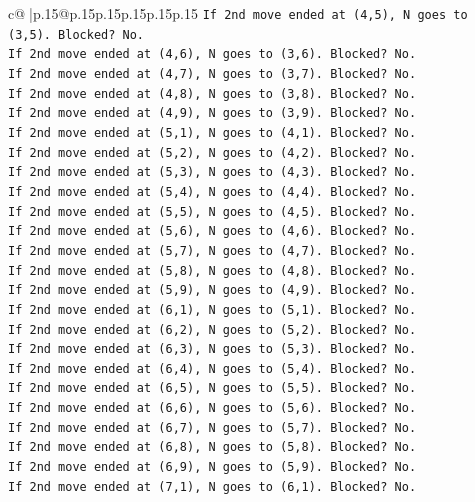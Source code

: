\documentclass{article}
\begin{document}
{\begin{supertabular}{c@{$\;$}|p{.15\linewidth}@{}p{.15\linewidth}p{.15\linewidth}p{.15\linewidth}p{.15\linewidth}p{.15\linewidth}}
{{{\texttt{If 2nd move ended at (4,5), N goes to (3,5). Blocked? No.} \\
\texttt{If 2nd move ended at (4,6), N goes to (3,6). Blocked? No.} \\
\texttt{If 2nd move ended at (4,7), N goes to (3,7). Blocked? No.} \\
\texttt{If 2nd move ended at (4,8), N goes to (3,8). Blocked? No.} \\
\texttt{If 2nd move ended at (4,9), N goes to (3,9). Blocked? No.} \\
\texttt{If 2nd move ended at (5,1), N goes to (4,1). Blocked? No.} \\
\texttt{If 2nd move ended at (5,2), N goes to (4,2). Blocked? No.} \\
\texttt{If 2nd move ended at (5,3), N goes to (4,3). Blocked? No.} \\
\texttt{If 2nd move ended at (5,4), N goes to (4,4). Blocked? No.} \\
\texttt{If 2nd move ended at (5,5), N goes to (4,5). Blocked? No.} \\
\texttt{If 2nd move ended at (5,6), N goes to (4,6). Blocked? No.} \\
\texttt{If 2nd move ended at (5,7), N goes to (4,7). Blocked? No.} \\
\texttt{If 2nd move ended at (5,8), N goes to (4,8). Blocked? No.} \\
\texttt{If 2nd move ended at (5,9), N goes to (4,9). Blocked? No.} \\
\texttt{If 2nd move ended at (6,1), N goes to (5,1). Blocked? No.} \\
\texttt{If 2nd move ended at (6,2), N goes to (5,2). Blocked? No.} \\
\texttt{If 2nd move ended at (6,3), N goes to (5,3). Blocked? No.} \\
\texttt{If 2nd move ended at (6,4), N goes to (5,4). Blocked? No.} \\
\texttt{If 2nd move ended at (6,5), N goes to (5,5). Blocked? No.} \\
\texttt{If 2nd move ended at (6,6), N goes to (5,6). Blocked? No.} \\
\texttt{If 2nd move ended at (6,7), N goes to (5,7). Blocked? No.} \\
\texttt{If 2nd move ended at (6,8), N goes to (5,8). Blocked? No.} \\
\texttt{If 2nd move ended at (6,9), N goes to (5,9). Blocked? No.} \\
\texttt{If 2nd move ended at (7,1), N goes to (6,1). Blocked? No.} \\
}}}
\end{supertabular}}
\end{document}
